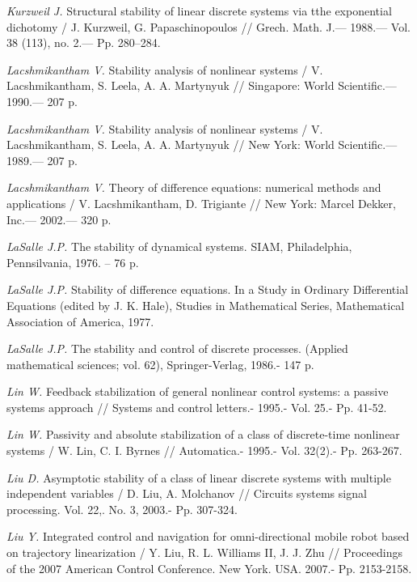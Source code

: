 \begin{thebibliography}{10}
	
	
	{\it Kurzweil J.} Structural stability of linear discrete systems via tthe exponential dichotomy / J. Kurzweil, G. Papaschinopoulos // Grech. Math. J.— 1988.— Vol. 38 (113), no. 2.— Pp. 280–284.
	
	{\it Lacshmikantham V.} Stability analysis of nonlinear systems / V. Lacshmikantham, S. Leela, A. A. Martynyuk // Singapore: World Scientific.— 1990.— 207 p.
	
	{\it Lacshmikantham V.} Stability analysis of nonlinear systems / V. Lacshmikantham, S. Leela, A. A. Martynyuk // New York: World Scientific.— 1989.— 207 p.
	
	{\it Lacshmikantham V.} Theory of difference equations: numerical methods and applications / V. Lacshmikantham, D. Trigiante // New York: Marcel Dekker, Inc.— 2002.— 320 p.
	
	{\it LaSalle J.P.} The stability of dynamical systems. SIAM, Philadelphia, Pennsilvania, 1976. – 76 p.
	
	{\it LaSalle J.P.} Stability of difference equations. In a Study in Ordinary Differential Equations (edited by J. K. Hale), Studies in Mathematical Series, Mathematical Association of America, 1977.
	
	{\it LaSalle J.P.} The stability and control of discrete processes. (Applied mathematical sciences; vol. 62), Springer-Verlag, 1986.- 147 p.
	
	{\it Lin W.} Feedback stabilization of general nonlinear control systems: a passive systems approach // Systems and control letters.- 1995.- Vol. 25.- Pp. 41-52.
	
	{\it Lin W.} Passivity and absolute stabilization of a class of discrete-time nonlinear systems / W. Lin, C. I. Byrnes // Automatica.- 1995.- Vol. 32(2).- Pp. 263-267.
	
	{\it Liu D.} Asymptotic stability of a class of linear discrete systems with multiple independent variables / D. Liu, A. Molchanov // Circuits systems signal processing. Vol. 22,. No. 3, 2003.- Pp. 307-324.
	
	
	{\it Liu Y.} Integrated control and navigation for omni-directional mobile robot based on trajectory linearization / Y. Liu, R. L. Williams II, J. J. Zhu // Proceedings of the 2007 American Control Conference. New York. USA. 2007.- Pp. 2153-2158.
	

\end{thebibliography}
